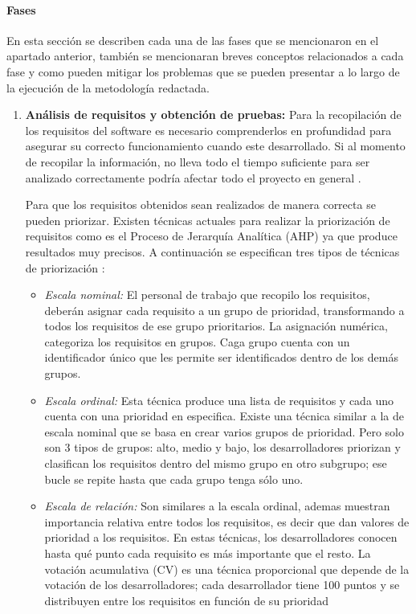 \paragraph{Fases}

En esta sección se describen cada una de las fases que se mencionaron en el apartado anterior, también se mencionaran breves conceptos relacionados a cada fase y como pueden mitigar los problemas que se pueden presentar a lo largo de la ejecución de la metodología redactada. 

\begin{enumerate}
	\item \textbf{Análisis de requisitos y obtención de pruebas:} Para la recopilación de los requisitos del software es necesario comprenderlos en profundidad para asegurar su correcto funcionamiento cuando este desarrollado. Si al momento de recopilar la información, no lleva todo el tiempo suficiente para ser analizado correctamente podría afectar todo el proyecto en general \cite{Mohamed}.
	
	Para que los requisitos obtenidos sean realizados de manera correcta se pueden priorizar. Existen técnicas actuales para realizar la priorización de requisitos como es el Proceso de Jerarquía Analítica (AHP) ya que produce resultados muy precisos. A continuación se especifican  tres tipos de técnicas de priorización \cite{Mohamed}:
	
	\begin{itemize}
		\item \textit{Escala nominal: } El personal de trabajo que recopilo los requisitos, deberán asignar cada requisito a un grupo de prioridad, transformando a todos los requisitos de ese grupo prioritarios. La asignación numérica, categoriza los requisitos en grupos. Caga grupo cuenta con un identificador único que les permite ser identificados dentro de los demás grupos. 
		\item \textit{Escala ordinal: } Esta técnica produce una lista de requisitos y cada uno cuenta con una prioridad en especifica. Existe una técnica similar a la de escala nominal que se basa en crear varios grupos de prioridad. Pero solo son 3 tipos de grupos: alto, medio y bajo, los desarrolladores priorizan y clasifican los requisitos dentro del mismo grupo en otro subgrupo; ese bucle se repite hasta que cada grupo tenga sólo uno.
		\item \textit{Escala de relación: }Son similares a la escala ordinal, ademas muestran importancia relativa entre todos los requisitos, es decir que dan valores de prioridad a los requisitos.	En estas técnicas, los desarrolladores conocen hasta qué punto cada requisito es más importante que el resto. La votación acumulativa (CV) es una técnica proporcional que depende de la votación de los desarrolladores; cada desarrollador tiene 100 puntos y se distribuyen entre los requisitos en función de su prioridad 
	\end{itemize}
	

\end{enumerate}
